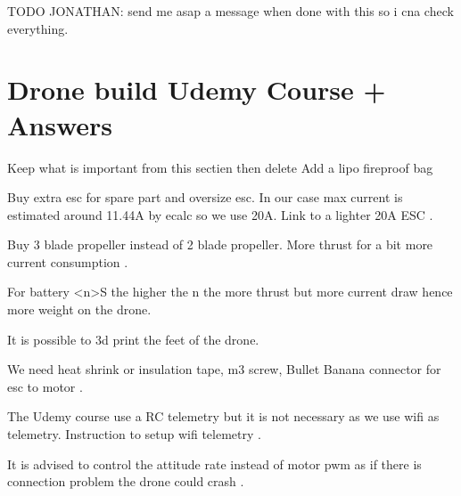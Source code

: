 {\color{red}TODO JONATHAN: send me asap a message when done with this so i cna check everything. \\}

\section{Drone build Udemy Course + Answers}
 {\color{red} Keep what is important from this sectien then delete}
Add a lipo fireproof bag

Buy extra esc for spare part and oversize esc. In our case max current is estimated around 11.44A by ecalc so we use 20A. Link to a lighter 20A ESC \cite{bangood_racerstar}.

Buy 3 blade propeller instead of 2 blade propeller. More thrust for a bit more current consumption \cite{bangood_propeller_3_blade}.

For battery <n>S the higher the n the more thrust but more current draw hence more weight on the drone.

It is possible to 3d print the feet of the drone.

We need heat shrink or insulation tape, m3 screw, Bullet Banana connector for esc to motor \cite{bangood_bullet_banana_connector}.

The Udemy course use a RC telemetry but it is not necessary as we use wifi as telemetry. Instruction to setup wifi telemetry \cite{emlid_ardupilot_installation}.


It is advised to control the attitude rate instead of motor pwm as if there is connection problem the drone could crash \cite{px4_low_level_control}.
